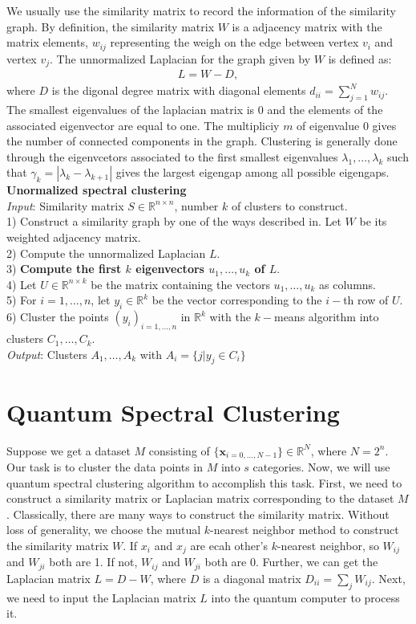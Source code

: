 \documentclass[onecolumn,notitlepage]{revtex4-1}
\def\vec#1{{\bm #1}}
\begin{document}
We usually use the similarity matrix to record the information of the similarity graph. By definition, the similarity matrix $W$ is a adjacency matrix with the matrix elements, $w_{ij}$ representing the weigh on the edge between vertex $v_{i}$ and vertex $v_{j}$. The unnormalized Laplacian
for the graph given by $W$ is defined as:
\begin{align}
    L= W-D,
\end{align}
where $D$ is the digonal degree matrix with diagonal elements $d_{ii} = \sum_{j=1}^N w_{ij}$. The smallest eigenvalues of the laplacian matrix is 0 and the elements of the associated eigenvector are equal to one. The multipliciy $m$ of eigenvalue 0 gives the number of connected components in the graph. Clustering is generally done through the eigenvcetors associated to the first smallest eigenvalues $\lambda_1,...,\lambda_k$ such that $\gamma_{k}=|\lambda_{k}-\lambda_{k+1}|$ gives the largest eigengap among all possible eigengaps.\\
\textbf{Unormalized spectral clustering}\\
\emph{Input}: Similarity matrix $S \in \mathbb{R}^{n\times n}$, number $k$ of clusters to construct.\\
1) Construct a similarity graph by one of the ways described in. Let $W$ be its weighted adjacency matrix.\\
2) Compute the unnormalized Laplacian $L$.\\
3) \textbf{Compute the first $k$ eigenvectors $u_{1},\ldots,u_{k}$ of $L$}.\\
4) Let $U \in \mathbb{R}^{n \times k}$ be the matrix containing the vectors $u_{1},\ldots,u_{k}$ as columns.\\
5) For $i=1,\ldots,n$, let $y_{i} \in \mathbb{R}^{k}$ be the vector corresponding to the $i-$th row of $U$.\\
6) Cluster the points $(y_{i})_{i=1,\ldots,n}$ in $\mathbb{R}^{k}$ with the $k-$means algorithm into clusters $C_{1},\ldots,C_{k}$.\\
\emph{Output}: Clusters $A_{1},\ldots,A_{k}$ with $A_{i}=\{j|y_{j}\in C_{i}\}$



\section{Quantum Spectral Clustering}
Suppose we get a dataset $M$ consisting of $\{\vec{x_{i=0,\dots,N-1}} \} \in \mathbb{R}^{N}$, where $N=2^{n}$. 
Our task is to cluster the data points in $M$ into $s$ categories. 
Now, we will use quantum spectral clustering algorithm to accomplish this task. 
First, we need to construct a similarity matrix or Laplacian matrix corresponding to the dataset $M$. 
Classically, there are many ways to construct the similarity matrix. 
Without loss of generality, we choose the mutual $k$-nearest neighbor method to construct the similarity matrix $W$. 
If $x_i$ and $x_j$ are ecah other's $k$-nearest neighbor, so $W_{ij}$ and $W_{ji}$ both are 1. 
If not, $W_{ij}$ and $W_{ji}$ both are 0. Further, we can get the Laplacian matrix $L=D-W$, where $D$ is a diagonal matrix $D_{ii}=\sum_{j}W_{ij}$. 
Next, we need to input the Laplacian matrix $L$ into the quantum computer to process it. 
\end{document}
